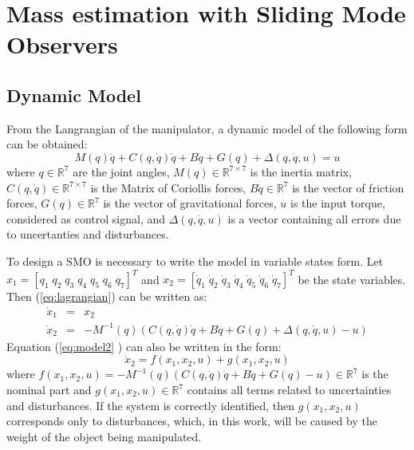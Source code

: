 \documentclass[a4paper, 10pt]{article}
\begin{document}
\section{Mass estimation with Sliding Mode Observers}
\subsection{Dynamic Model}
  From the Langrangian of the manipulator, a dynamic model of the following form can be obtained:
  \begin{equation}
    M(q)\ddot{q} + C(q, \dot{q})\dot{q} + B\dot{q} + G(q) + \Delta(q,\dot{q}, u) = u
    \label{eq:lagrangian}
  \end{equation}
  where $q\in \mathbb{R}^7$ are the joint angles, $M(q)\in \mathbb{R}^{7\times 7}$ is the inertia matrix, $C(q,\dot{q})\in \mathbb{R}^{7\times 7}$ is the Matrix of Coriollis forces, $B\dot{q}\in \mathbb{R}^7$ is the vector of friction forces, $G(q)\in\mathbb{R}^7$ is the vector of gravitational forces, $u$ is the input torque, considered as control signal, and $\Delta(q,\dot{q},u)$ is a vector containing all errors due to uncertanties and disturbances.
  
  To design a SMO is necessary to write the model in variable states form. Let $x_1 = [q_1\;q_2\;q_3\;q_4\;q_5\;q_6\;q_7]^T$ and $x_2 = [\dot{q}_1\;\dot{q}_2\;\dot{q}_3\;\dot{q}_4\;\dot{q}_5\;\dot{q}_6\;\dot{q}_7]^T$ be the state variables. Then (\ref{eq:lagrangian}) can be written as:
  \begin{eqnarray}
    \dot{x}_1 &=& x_2\label{eq:model1}\\
    \dot{x}_2 &=& -M^{-1}(q)\left(C(q, \dot{q})\dot{q} + B\dot{q} + G(q) + \Delta(q,\dot{q},u) - u\right)\label{eq:model2}
  \end{eqnarray}
Equation (\ref{eq:model2} ) can also be written in the form:
  \begin{equation*}
    \dot{x}_2 = f(x_1, x_2, u) + g(x_1, x_2, u)
  \end{equation*}
  where $f(x_1, x_2, u) = -M^{-1}(q)\left(C(q, \dot{q})\dot{q} + B\dot{q} + G(q) - u\right) \in \mathbb{R}^7$ is the nominal part and $g(x_1, x_2, u) \in \mathbb{R}^7$ contains all terms related to uncertainties and disturbances. If the system is correctly identified, then $g(x_1, x_2, u)$ corresponds only to disturbances, which, in this work, will be caused by the weight of the object being manipulated. 
\end{document}
